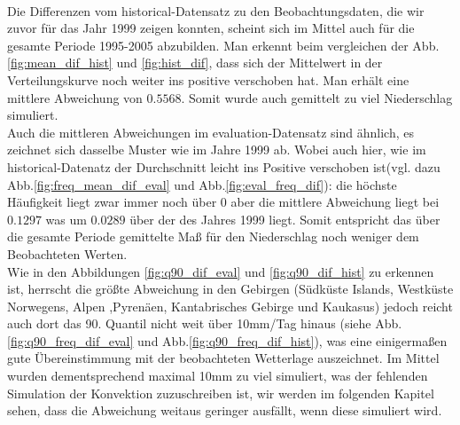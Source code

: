 \\
Die Differenzen vom historical-Datensatz zu den Beobachtungsdaten, die wir zuvor für das Jahr 1999 zeigen konnten, scheint sich im Mittel auch für die gesamte Periode 1995-2005 abzubilden. Man erkennt beim vergleichen der Abb. \ref{fig:mean_dif_hist} und \ref{fig:hist_dif}, dass sich der Mittelwert in der Verteilungskurve noch weiter ins positive verschoben hat. Man erhält eine mittlere Abweichung von $0.5568$. Somit wurde auch gemittelt zu viel Niederschlag simuliert.\\
Auch die mittleren Abweichungen im evaluation-Datensatz sind ähnlich, es zeichnet sich dasselbe Muster wie im Jahre 1999 ab. Wobei auch hier, wie im historical-Datenatz der Durchschnitt leicht ins Positive verschoben ist(vgl. dazu Abb.\ref{fig:freq_mean_dif_eval} und Abb.\ref{fig:eval_freq_dif}): die höchste Häufigkeit liegt zwar immer noch über $0$ aber die mittlere Abweichung liegt bei $0.1297$ was um $0.0289$ über der des Jahres 1999 liegt. Somit entspricht das über die gesamte Periode gemittelte Maß für den Niederschlag noch weniger dem Beobachteten Werten.\\
Wie in den Abbildungen \ref{fig:q90_dif_eval} und \ref{fig:q90_dif_hist} zu erkennen ist, herrscht die größte Abweichung in den Gebirgen (Südküste Islands, Westküste Norwegens, Alpen ,Pyrenäen, Kantabrisches Gebirge und Kaukasus) jedoch reicht auch dort das 90. Quantil nicht weit über 10mm/Tag hinaus (siehe Abb.\ref{fig:q90_freq_dif_eval} und Abb.\ref{fig:q90_freq_dif_hist}), was eine einigermaßen gute Übereinstimmung mit der beobachteten Wetterlage auszeichnet. Im Mittel wurden dementsprechend maximal 10mm zu viel simuliert, was der fehlenden Simulation der Konvektion zuzuschreiben ist, wir werden im folgenden Kapitel sehen, dass die Abweichung weitaus geringer ausfällt, wenn diese simuliert wird.
